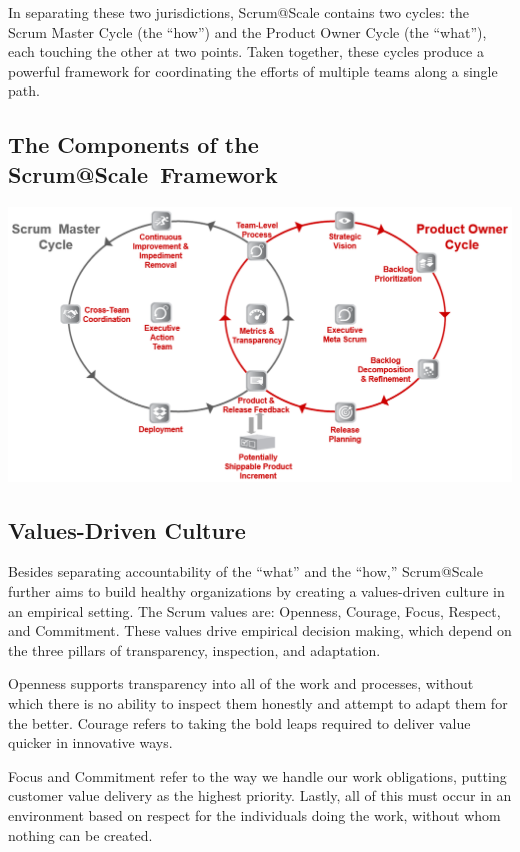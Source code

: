 \documentclass[12pt,a4paper,parskip=full]{scrartcl}
\begin{document}
In separating these two jurisdictions, Scrum@Scale contains two cycles: the
Scrum Master Cycle (the ``how'') and the Product Owner Cycle (the
``what''), each touching the other at two points. Taken together, these
cycles produce a powerful framework for coordinating the efforts of
multiple teams along a single path.

\subsection{The Components of the Scrum@Scale\textregistered ~Framework}

\includegraphics[width=1.0\linewidth]{SMPO-Cycle.png}

\subsection{Values-Driven Culture}
Besides separating accountability of the ``what'' and the ``how,''
Scrum@Scale further aims to build healthy organizations by creating a
values-driven culture in an empirical setting. The Scrum values are:
Openness, Courage, Focus, Respect, and Commitment. These values drive
empirical decision making, which depend on the three pillars of
transparency, inspection, and adaptation.

Openness supports transparency into all of the work and processes, without
which there is no ability to inspect them honestly and attempt to adapt
them for the better. Courage refers to taking the bold leaps required to
deliver value quicker in innovative ways.

Focus and Commitment refer to the way we handle our work obligations,
putting customer value delivery as the highest priority. Lastly, all of
this must occur in an environment based on respect for the individuals
doing the work, without whom nothing can be created.
\end{document}

